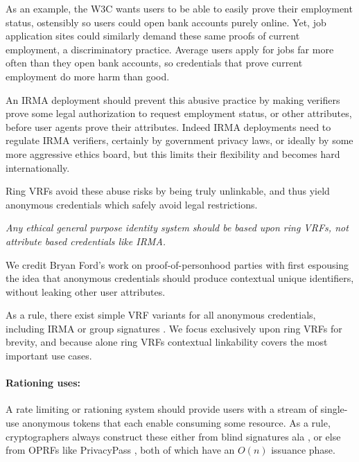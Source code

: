 As an example, the W3C wants users to be able to easily prove their
employment status, ostensibly so users could open bank accounts purely
online.  Yet, job application sites could similarly demand these same
proofs of current employment, a discriminatory practice.
Average users apply for jobs far more often than they open bank accounts,
so credentials that prove current employment do more harm than good.

An IRMA deployment should prevent this abusive practice by making
verifiers prove some legal authorization to request employment status,
or other attributes, before user agents prove their attributes.
Indeed IRMA deployments need to regulate IRMA verifiers, certainly by
government privacy laws, or ideally by some more aggressive ethics board,
but this limits their flexibility and becomes hard internationally.

Ring VRFs avoid these abuse risks by being truly unlinkable, and thus
yield anonymous credentials which safely avoid legal restrictions.

{\it Any ethical general purpose identity system should be based
upon ring VRFs, not attribute based credentials like IRMA.}

We credit Bryan Ford's work on proof-of-personhood parties \cite{pop2008,pop2017}
with first espousing the idea that anonymous credentials should produce
contextual unique identifiers, without leaking other user attributes.

As a rule, there exist simple VRF variants for all anonymous credentials,
including IRMA \cite{IRMAcredentials} or group signatures \cite{group_sig_survey}.
We focus exclusively upon ring VRFs for brevity, and because alone
ring VRFs contextual linkability covers the most important use cases.

\paragraph{Rationing uses:}

A rate limiting or rationing system should provide users with a stream
of single-use anonymous tokens that each enable consuming some resource.
As a rule, cryptographers always construct these either
 from blind signatures ala \cite{chaum83}, or else
 from OPRFs like PrivacyPass \cite{PrivacyPass},
both of which have an $O(n)$ issuance phase.

